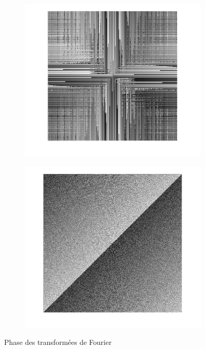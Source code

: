 \documentclass[12pt,a4paper,onecolumn]{article}
\begin{document}
\begin{figure}[H]
\begin{subfigure}[b]{0.4\textwidth}
		\label{fig_11_tf_ph_per}
	\end{subfigure}
	\begin{subfigure}[b]{0.4\textwidth}
		\centering
		\includegraphics[height = 0.25\textheight]{tf_ph_smooth}
		\label{fig_11_tf_ph_smooth}
	\end{subfigure}
	\begin{subfigure}[b]{\textwidth}
		\centering
		\includegraphics[height = 0.25\textheight]{tf_ph_sym}
		\label{fig_11_tf_ph_sym}
	\end{subfigure}
	\caption{Phase des transformées de Fourier}
	\label{fig_11_tf_ph}
\end{figure}
\end{document}
